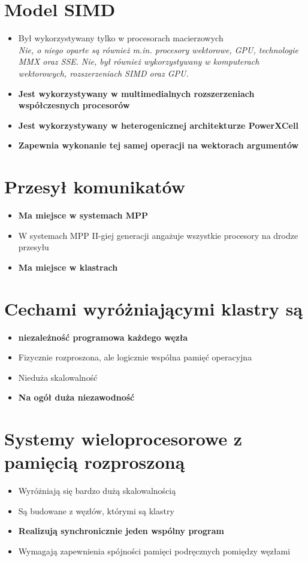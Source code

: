 \documentclass[a4paper,twoside]{article}
\begin{document}
\section{Model SIMD}
	\begin{itemize}
    \item Był wykorzystywany tylko w procesorach macierzowych\\
    {\small \emph{Nie, o niego oparte są również m.in. procesory wektorowe, GPU, technologie MMX oraz SSE.}}
    {\small \emph{Nie, był również wykorzystywany w komputerach wektorowych, rozszerzeniach SIMD oraz GPU.}}
    \item \textbf{Jest wykorzystywany w multimedialnych rozszerzeniach współczesnych procesorów}
    \item \textbf{Jest wykorzystywany w heterogenicznej architekturze PowerXCell}
    \item \textbf{Zapewnia wykonanie tej samej operacji na wektorach argumentów}
    \end{itemize}

\section{Przesył komunikatów}
	\begin{itemize}
    \item \textbf{Ma miejsce w systemach MPP}
    \item W systemach MPP II-giej generacji angażuje wszystkie procesory na drodze przesyłu
    \item \textbf{Ma miejsce w klastrach}
    \end{itemize}

\section{Cechami wyróżniającymi klastry są}
	\begin{itemize}
    \item \textbf{niezależność programowa każdego węzła}
    \item Fizycznie rozproszona, ale logicznie wspólna pamięć operacyjna
    \item Nieduża skalowalność
    \item \textbf{Na ogół duża niezawodność}
    \end{itemize}

\section{Systemy wieloprocesorowe z pamięcią rozproszoną}
	\begin{itemize}
    \item Wyróżniają się bardzo dużą skalowalnością
    \item Są budowane z węzłów, którymi są klastry
    \item \textbf{Realizują synchronicznie jeden wspólny program}
    \item Wymagają zapewnienia spójności pamięci podręcznych pomiędzy węzłami
    \end{itemize}
\end{document}
